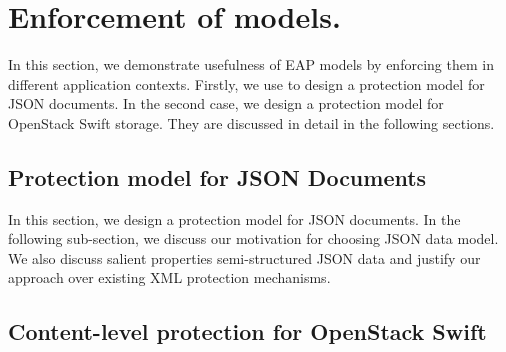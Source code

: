 \chapter{Enforcement of \eapABAC{} models.}
In this section, we demonstrate usefulness of EAP models by enforcing them in different application contexts. Firstly, we use \eapABAC{} to design a protection model for JSON documents. In the second case, we design a protection model for OpenStack Swift storage.  They are discussed in detail in the following sections.
\section{Protection model for JSON Documents}
	In this section, we design a protection model for JSON documents. In the following sub-section, we discuss our motivation for choosing JSON data model. We also discuss salient properties semi-structured JSON data and justify our approach over existing XML protection mechanisms. 
	
\section{Content-level protection for OpenStack Swift}
	